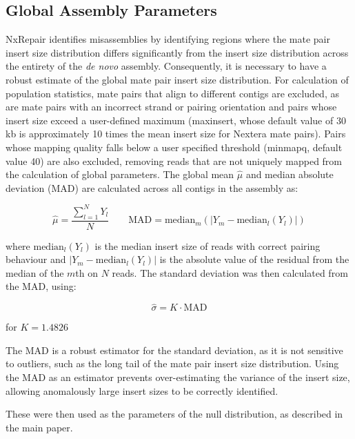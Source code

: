 \documentclass[fleqn,10pt]{wlpeerj}
\begin{document}
\subsection*{Global Assembly Parameters}
NxRepair identifies misassemblies by identifying regions where the mate pair insert size distribution differs significantly from the insert size distribution across the entirety of the \textit{de novo} assembly. Consequently, it is necessary to have a robust estimate of the global mate pair insert size distribution. For calculation of population statistics, mate pairs that align to different contigs are excluded, as are mate pairs with an incorrect strand or pairing orientation and pairs whose insert size exceed a user-defined maximum (maxinsert, whose default value of 30 kb is approximately 10 times the mean insert size for Nextera mate pairs). Pairs whose mapping quality falls below a user specified threshold (minmapq, default value 40) are also excluded, removing reads that are not uniquely mapped from the calculation of global parameters. The global mean $\hat{\mu}$ and median absolute deviation ($\text{MAD}$) are calculated across all contigs in the assembly as:

\begin{equation}
\hat{\mu} = \frac{\sum_{l=1}^N Y_l}{N} \qquad \text{MAD} = \text{median}_m(|Y_m - \text{median}_l(Y_l)|)
\label{eq:global}
\end{equation}

where $\text{median}_l(Y_l)$ is the median insert size of reads with correct pairing behaviour and $|Y_m - \text{median}_l(Y_l)|$ is the absolute value of the residual from the median of the $m$th on $N$ reads. The standard deviation was then calculated from the MAD, using:

\begin{equation}
\hat{\sigma} = K \cdot \text{MAD}
\label{eq:mad_to_sigma}
\end{equation}

for $K = 1.4826$

The $\text{MAD}$ is a robust estimator for the standard deviation, as it is not sensitive to outliers, such as the long tail of the mate pair insert size distribution. Using the MAD as an estimator prevents over-estimating the variance of the insert size, allowing anomalously large insert sizes to be correctly identified.

These were then used as the parameters of the null distribution, as described in the main paper.
\end{document}
